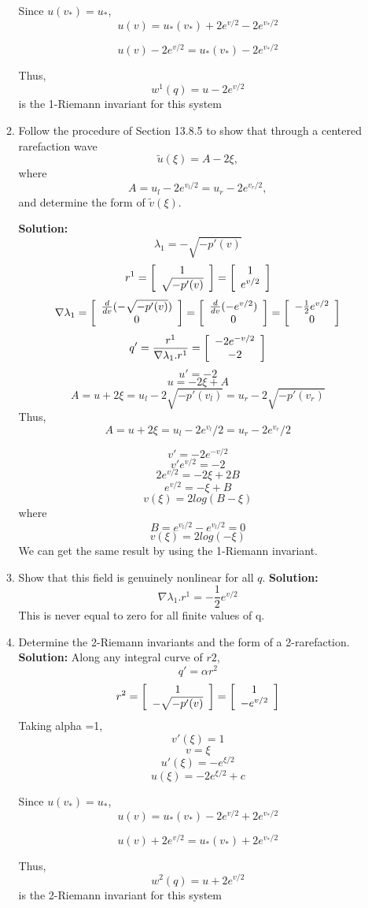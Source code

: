 \documentclass[11pt]{article}
\newenvironment{mat}{\left[ \begin{array}{ccccccccccccc}}{\end{array}\right]}
\newcommand\bcm{\begin{mat}}
\newcommand\ecm{\end{mat}}
\begin{document}
\begin{enumerate}
\begin{enumerate}
 Since $u(v_*)=u_*$,
  \[u(v)=u_*(v_*)+ 2e^{v/2}-2e^{v_*/2} \]
  
    \[u(v)- 2e^{v/2}=u_*(v_*)-2e^{v_*/2} \]
 
Thus,
\[
w^1(q) = u - 2e^{v/2}
\]
is the 1-Riemann invariant for this system
\item Follow the procedure of Section 13.8.5 to show that through a centered
rarefaction wave 
\[
\tilde u(\xi) = A - 2\xi,
\]
where 
\[
A = u_l - 2 e^{v_l/2} = u_r - 2e^{v_r/2},
\]
and determine the form of $\tilde v(\xi)$.

\vskip 1cm
{\bf Solution:}
\[\lambda_1=- \sqrt{-p'(v)}\]
 \[r^1 = \bcm 1\\  \sqrt{-p'(v)}\ecm= \bcm 1\\  e^{v/2}\ecm\]
\[\nabla \lambda_1 = \bcm \frac{d}{dv} (- \sqrt{-p'(v)})\\0 \ecm  = \bcm \frac{d}{dv} (- e^{v/2})\\0 \ecm = \bcm  -\frac{1}{2} e^{v/2}\\0 \ecm\] 
\[ q' = \frac{r^1}{\nabla \lambda_1 .r^1}= \bcm  -2 e^{-v/2}\\-2 \ecm\]
\[ u' = -2 \]
\[ u = -2 \xi +A \]
\[A= u + 2\xi = u_l - 2 \sqrt{- p'(v_l)} =u_r - 2 \sqrt{- p'(v_r)} \]
Thus,
\[A= u + 2\xi = u_l - 2 e^{{v_l}}/2 =u_r - 2 e^{{v_r}}/2 \]

\[ v' =-2 e^{-v/2} \]
\[ v' e^{v/2}=-2 \]
\[ 2e^{v/2}=-2\xi +2B\]
\[ e^{v/2}=-\xi +B\]
\[ v(\xi)=2 log(B-\xi) \]
where
\[ B= e^{v_l/2} -e^{v_l/2} =0  \]
\[ v(\xi)=2 log(-\xi) \]
We can get the same result by using the 1-Riemann invariant.
\item Show that this field is genuinely nonlinear for all $q$.
\vskip 1cm
{\bf Solution:}
 \[\nabla \lambda_1 . r^1 = -\frac{1}{2} e^{v/2} \]
  This is never equal to zero for all finite values of q. 
\item Determine the 2-Riemann invariants and the form of a 2-rarefaction.
\vskip 1cm
{\bf Solution:}
Along any integral curve of $r2$,
\[q' = \alpha r^2\]
\[r^2 = \bcm 1\\ - \sqrt{-p'(v)}\ecm= \bcm 1\\ - e^{v/2}\ecm \]
Taking alpha =1,
\[v'(\xi)= 1\]
\[v= \xi\]
\[u'(\xi)=-e^{\xi/2}\]
\[u(\xi)=-2e^{\xi/2}+c\]

Since $u(v_*)=u_*$,
\[u(v)=u_*(v_*)- 2e^{v/2}+2e^{v_*/2} \]

\[u(v)+ 2e^{v/2}=u_*(v_*)+2e^{v_*/2} \]

Thus,
\[
w^2(q) = u + 2e^{v/2}
\]
is the 2-Riemann invariant for this system


\end{enumerate}
\end{enumerate}
\end{document}
